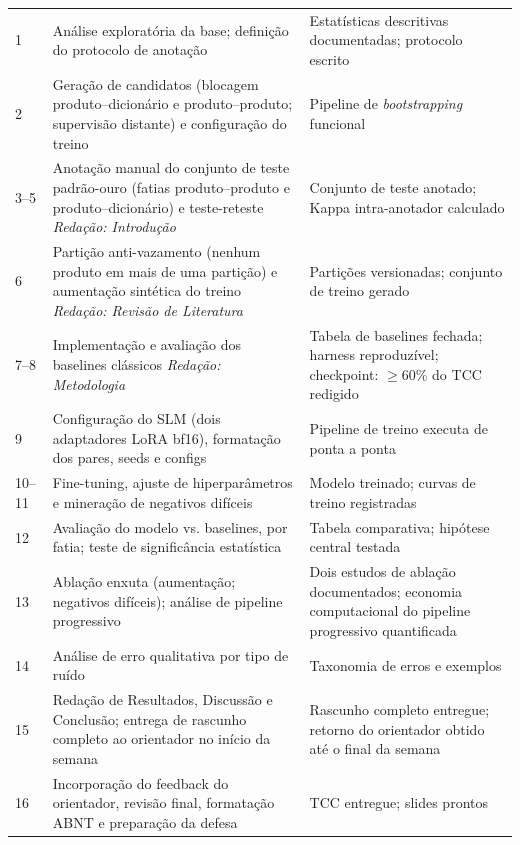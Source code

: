 \begin{longtable}{p{1.8cm} p{6.5cm} p{6.2cm}}
1 & Análise exploratória da base; definição do protocolo de anotação & Estatísticas descritivas documentadas; protocolo escrito \\
2 & Geração de candidatos (blocagem produto--dicionário e produto--produto; supervisão distante) e configuração do treino & Pipeline de \textit{bootstrapping} funcional \\
3--5 & Anotação manual do conjunto de teste padrão-ouro (fatias produto--produto e produto--dicionário) e teste-reteste \newline \textit{Redação: Introdução} & Conjunto de teste anotado; Kappa intra-anotador calculado \\
6 & Partição anti-vazamento (nenhum produto em mais de uma partição) e aumentação sintética do treino \newline \textit{Redação: Revisão de Literatura} & Partições versionadas; conjunto de treino gerado \\
7--8 & Implementação e avaliação dos baselines clássicos \newline \textit{Redação: Metodologia} & Tabela de baselines fechada; harness reproduzível; checkpoint: $\geq$60\% do TCC redigido \\
9 & Configuração do SLM (dois adaptadores LoRA bf16), formatação dos pares, seeds e configs & Pipeline de treino executa de ponta a ponta \\
10--11 & Fine-tuning, ajuste de hiperparâmetros e mineração de negativos difíceis & Modelo treinado; curvas de treino registradas \\
12 & Avaliação do modelo vs. baselines, por fatia; teste de significância estatística & Tabela comparativa; hipótese central testada \\
13 & Ablação enxuta (aumentação; negativos difíceis); análise de pipeline progressivo & Dois estudos de ablação documentados; economia computacional do pipeline progressivo quantificada \\
14 & Análise de erro qualitativa por tipo de ruído & Taxonomia de erros e exemplos \\
15 & Redação de Resultados, Discussão e Conclusão; entrega de rascunho completo ao orientador no início da semana & Rascunho completo entregue; retorno do orientador obtido até o final da semana \\
16 & Incorporação do feedback do orientador, revisão final, formatação ABNT e preparação da defesa & TCC entregue; slides prontos \\

\end{longtable}
\vspace{-4mm}
